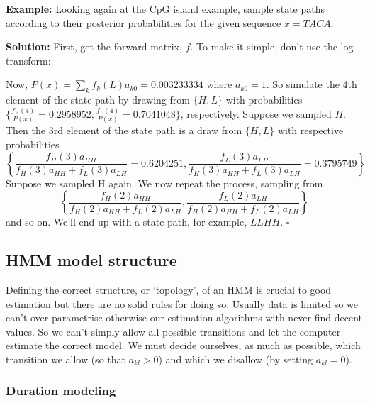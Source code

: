\documentclass[11pt]{article}
\newcommand{\sqend}{\hfill $\square$}
\begin{document}
{\bf Example:} Looking again at the CpG island example, sample state paths according to their posterior probabilities for the given sequence $x = TACA$.

{\bf Solution:} First, get the forward matrix, $f$.  To make it simple, don't use the log transform:



Now, $P(x) =  \sum_k f_k(L)a_{k0} =   0.003233334$ where $a_{k0} = 1$. So simulate the 4th element of the state path by drawing from $\{H,L\}$ with probabilities $\{ \frac{f_H(4)}{P(x)} = 0.2958952,  \frac{f_L(4)}{P(x)} = 0.7041048 \}$, respectively.  Suppose we sampled $H$.  Then the 3rd element of the state path is a draw from $\{H,L\}$ with respective probabilities 
\[
\left\{ \frac{f_H(3)a_{HH}}{f_H(3)a_{HH} + f_L(3)a_{LH}} =  0.6204251, \frac{f_L(3)a_{LH}}{f_H(3)a_{HH} + f_L(3)a_{LH}}  = 0.3795749\right\}
\]
Suppose we sampled H again.  We now repeat the process, sampling from 
\[
\left\{ \frac{f_H(2)a_{HH}}{f_H(2)a_{HH} + f_L(2)a_{LH}}, \frac{f_L(2)a_{LH}}{f_H(2)a_{HH} + f_L(2)a_{LH}} \right\}
\]
and so on.  We'll end up with a state path, for example, $LLHH$. \sqend

\subsection{HMM model structure}

Defining the correct structure, or `topology', of an HMM is crucial to good estimation but there are no solid rules for doing so.  Usually data is limited so we can't over-parametrise otherwise our estimation algorithms with never find decent values.   So we can't simply allow all possible transitions and let the computer estimate the correct model.  We must decide ourselves, as much as possible, which transition we allow (so that $a_{kl} > 0$) and which we disallow (by setting $a_{kl}=0$).

\subsubsection{Duration modeling}
\end{document}
